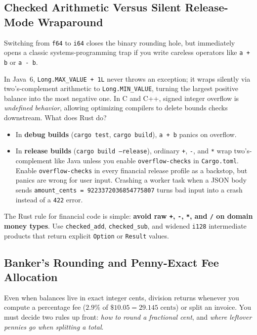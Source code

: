\subsection{Checked Arithmetic Versus Silent Release-Mode Wraparound}

Switching from \texttt{f64} to \texttt{i64} closes the binary rounding hole, but immediately opens a classic systems-programming trap if you write careless operators like \texttt{a + b} or \texttt{a - b}.

In Java~6, \texttt{Long.MAX\_VALUE + 1L} never throws an exception; it wraps silently via two's-complement arithmetic to \texttt{Long.MIN\_VALUE}, turning the largest positive balance into the most negative one. In C and C++, signed integer overflow is \emph{undefined behavior}, allowing optimizing compilers to delete bounds checks downstream. What does Rust do?
\begin{itemize}
  \item In \textbf{debug builds} (\texttt{cargo test}, \texttt{cargo build}), \texttt{a + b} panics on overflow.
  \item In \textbf{release builds} (\texttt{cargo build --release}), ordinary \texttt{+}, \texttt{-}, and \texttt{*} wrap two's-complement like Java unless you enable \texttt{overflow-checks} in \texttt{Cargo.toml}. Enable \texttt{overflow-checks} in every financial release profile as a backstop, but panics are wrong for user input. Crashing a worker task when a JSON body sends \texttt{amount\_cents = 9223372036854775807} turns bad input into a crash instead of a \texttt{422} error.
\end{itemize}

The Rust rule for financial code is simple: \textbf{avoid raw \texttt{+}, \texttt{-}, \texttt{*}, and \texttt{/} on domain money types}. Use \texttt{checked\_add}, \texttt{checked\_sub}, and widened \texttt{i128} intermediate products that return explicit \texttt{Option} or \texttt{Result} values.

\subsection{Banker's Rounding and Penny-Exact Fee Allocation}

Even when balances live in exact integer cents, division returns whenever you compute a percentage fee ($2.9\%$ of $\$10.05 = 29.145\text{ cents}$) or split an invoice. You must decide two rules up front: \emph{how to round a fractional cent}, and \emph{where leftover pennies go when splitting a total}.

